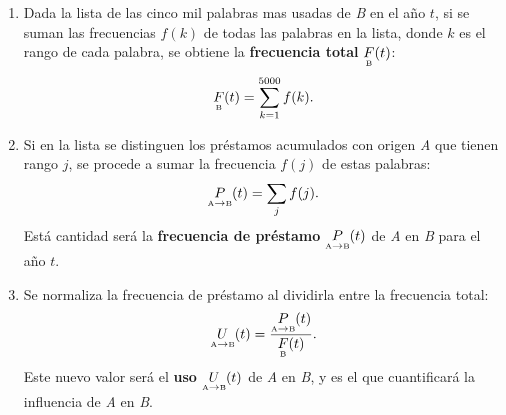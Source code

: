 \begin{enumerate}
	\label{proceso_uso}
	\item  Dada la lista de las cinco mil palabras mas usadas de \textit{B}
	en el año $t$, si se suman las frecuencias $f(k)$ de todas las palabras
	en la lista, donde $k$ es el rango  de cada palabra, se obtiene la
        \textbf{frecuencia total} $\underset{\text{\tiny B}}{F}(t)$:
	\begin{equation}
	\label{ec.ftot}
	\underset{\text{\tiny B}}{F}(t) = \sum_{k=1}^{5000} f(k).
	\end{equation}
	 
	
	\item Si en la lista se distinguen los préstamos acumulados con origen
	\textit{A}  que tienen rango $j$,  se procede a sumar la frecuencia
        $f(j)$ de estas palabras:
	\begin{equation}
	\label{ec.fpres}
	\underset{ \text{\tiny A} \to  \text{\tiny B} }{P}(t) = \sum_{j} f(j).
	\end{equation}
	Está cantidad será la  \textbf{frecuencia de préstamo} $\underset{
	\text{\tiny A} \to  \text{\tiny B} }{P}(t)$   de \textit{A} en
        \textit{B} para el año $t$.
	
	\item Se normaliza la frecuencia de préstamo al dividirla entre la
        frecuencia total:
	\begin{equation}
	\label{ec.fuso}
	\underset{ \text{\tiny A} \to  \text{\tiny B} }{U}(t) = \frac{
         \underset{ \text{\tiny A} \to  \text{\tiny B} }{P}(t)}{\underset{\text{\tiny
         B}}{F}(t) }.
	\end{equation}	
	Este nuevo valor será el \textbf{uso} $\underset{ \text{\tiny A} \to
	\text{\tiny B} }{U}(t)$  de \textit{A} en \textit{B}, y es el que
        cuantificará la influencia de \textit{A} en \textit{B}. 
\end{enumerate}


